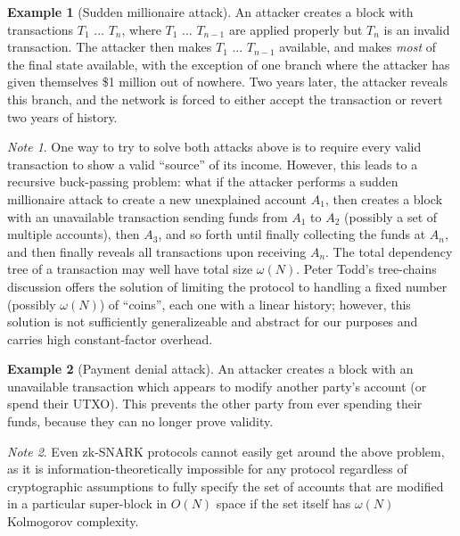 \documentclass[11pt,a4paper]{report}
\theoremstyle{plain}
\theoremstyle{definition}
\newtheorem{exmp}{Example}[section]
\theoremstyle{remark}
\newtheorem*{note}{Note}
\begin{document}
\begin{exmp}[Sudden millionaire attack]
An attacker creates a block with transactions $T_1$ ... $T_n$, where $T_1$ ... $T_{n-1}$ are applied properly but $T_n$ is an invalid transaction. The attacker then makes $T_1$ ... $T_{n-1}$ available, and makes \emph{most} of the final state available, with the exception of one branch where the attacker has given themselves \$1 million out of nowhere. Two years later, the attacker reveals this branch, and the network is forced to either accept the transaction or revert two years of history.
\end{exmp}

\begin{note}
One way to try to solve both attacks above is to require every valid transaction to show a valid ``source'' of its income. However, this leads to a recursive buck-passing problem: what if the attacker performs a sudden millionaire attack to create a new unexplained account $A_1$, then creates a block with an unavailable transaction sending funds from $A_1$ to $A_2$ (possibly a set of multiple accounts), then $A_3$, and so forth until finally collecting the funds at $A_n$, and then finally reveals all transactions upon receiving $A_n$. The total dependency tree of a transaction may well have total size $\omega(N)$. Peter Todd's tree-chains discussion offers the solution\cite{treechains} of limiting the protocol to handling a fixed number (possibly $\omega(N)$) of ``coins'', each one with a linear history; however, this solution is not sufficiently generalizeable and abstract for our purposes and carries high constant-factor overhead.
\end{note}

\begin{exmp}[Payment denial attack]
An attacker creates a block with an unavailable transaction which appears to modify another party's account (or spend their UTXO). This prevents the other party from ever spending their funds, because they can no longer prove validity.
\end{exmp}

\begin{note}
Even zk-SNARK protocols cannot easily get around the above problem, as it is information-theoretically impossible for any protocol regardless of cryptographic assumptions to fully specify the set of accounts that are modified in a particular super-block in $O(N)$ space if the set itself has $\omega(N)$ Kolmogorov complexity.
\end{note}
\end{document}

